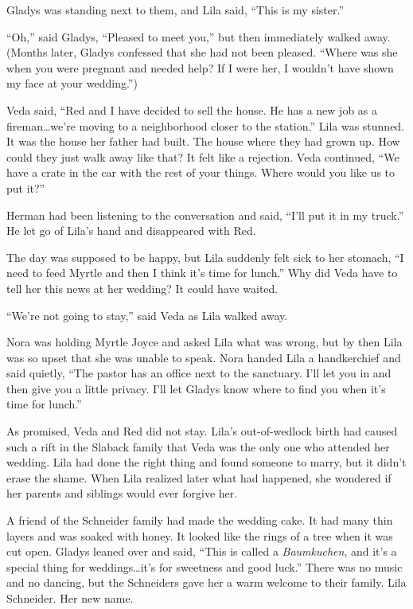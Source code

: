 \documentclass[
  letterpaper,
]{book}
\begin{document}
Gladys was standing next to them, and Lila said, ``This is my sister.''

``Oh,'' said Gladys, ``Pleased to meet you,'' but then immediately
walked away. (Months later, Gladys confessed that she had not been
pleased. ``Where was she when you were pregnant and needed help? If I
were her, I wouldn't have shown my face at your wedding.'')

Veda said, ``Red and I have decided to sell the house. He has a new job
as a fireman\ldots we're moving to a neighborhood closer to the
station.'' Lila was stunned. It was the house her father had built. The
house where they had grown up. How could they just walk away like that?
It felt like a rejection. Veda continued, ``We have a crate in the car
with the rest of your things. Where would you like us to put it?''

Herman had been listening to the conversation and said, ``I'll put it in
my truck.'' He let go of Lila's hand and disappeared with Red.

The day was supposed to be happy, but Lila suddenly felt sick to her
stomach, ``I need to feed Myrtle and then I think it's time for lunch.''
Why did Veda have to tell her this news at her wedding? It could have
waited.

``We're not going to stay,'' said Veda as Lila walked away.

Nora was holding Myrtle Joyce and asked Lila what was wrong, but by then
Lila was so upset that she was unable to speak. Nora handed Lila a
handkerchief and said quietly, ``The pastor has an office next to the
sanctuary. I'll let you in and then give you a little privacy. I'll let
Gladys know where to find you when it's time for lunch.''

As promised, Veda and Red did not stay. Lila's out-of-wedlock birth had
caused such a rift in the Slaback family that Veda was the only one who
attended her wedding. Lila had done the right thing and found someone to
marry, but it didn't erase the shame. When Lila realized later what had
happened, she wondered if her parents and siblings would ever forgive
her.

A friend of the Schneider family had made the wedding cake. It had many
thin layers and was soaked with honey. It looked like the rings of a
tree when it was cut open. Gladys leaned over and said, ``This is called
a \emph{Baumkuchen}, and it's a special thing for weddings\ldots it's
for sweetness and good luck.'' There was no music and no dancing, but
the Schneiders gave her a warm welcome to their family. Lila Schneider.
Her new name.
\end{document}
